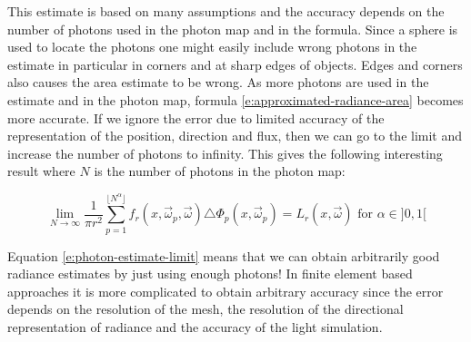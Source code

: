 This estimate is based on many assumptions and the accuracy depends on the number of photons used in the photon map and in the formula. Since a sphere is used to locate the photons one might easily include wrong photons in the estimate in particular in corners and at sharp edges of objects. Edges and corners also causes the area estimate to be wrong. As more photons are used in the estimate and in the photon map, formula \ref{e:approximated-radiance-area} becomes more accurate. If we ignore the error due to limited accuracy of the representation of the position, direction and flux, then we can go to the limit and increase the number of photons to infinity. This gives the following interesting result where $N$ is the number of photons in the photon map:

\begin{equation}\label{e:photon-estimate-limit}
	\lim_{N\to\infty}\frac{1}{\pi r^{2}}\sum^{\lfloor N^{\alpha}\rfloor}_{p=1}f_r(x,\vec{\omega}_p,\vec{\omega})\triangle\Phi_p(x,\vec{\omega}_p)=L_r(x,\vec{\omega})\text{ for }\alpha\in ]0,1[
\end{equation}

Equation \ref{e:photon-estimate-limit} means that we can obtain arbitrarily good radiance estimates by just using enough photons! In finite element based approaches it is more complicated to obtain arbitrary accuracy since the error depends on the resolution of the mesh, the resolution of the directional representation of radiance and the accuracy of the light simulation.

